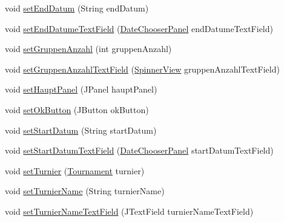 \begin{DoxyCompactItemize}
\item 
void \hyperlink{classde_1_1turnierverwaltung_1_1view_1_1_new_tournament_view_a16a3cedc2bb7866b9c2fd30a07f6a74f}{set\+End\+Datum} (String end\+Datum)
\item 
void \hyperlink{classde_1_1turnierverwaltung_1_1view_1_1_new_tournament_view_a263b61088619e38375dcf896c2e0568b}{set\+End\+Datume\+Text\+Field} (\hyperlink{classde_1_1turnierverwaltung_1_1view_1_1_date_chooser_panel}{Date\+Chooser\+Panel} end\+Datume\+Text\+Field)
\item 
void \hyperlink{classde_1_1turnierverwaltung_1_1view_1_1_new_tournament_view_a5e5ce0d3bdaaadc88e0e88e56a3fbbf8}{set\+Gruppen\+Anzahl} (int gruppen\+Anzahl)
\item 
void \hyperlink{classde_1_1turnierverwaltung_1_1view_1_1_new_tournament_view_a00d370c973799b4e56a149763f550d87}{set\+Gruppen\+Anzahl\+Text\+Field} (\hyperlink{classde_1_1turnierverwaltung_1_1view_1_1_spinner_view}{Spinner\+View} gruppen\+Anzahl\+Text\+Field)
\item 
void \hyperlink{classde_1_1turnierverwaltung_1_1view_1_1_new_tournament_view_a42e5aae628443b74b98d3dac5f86c26f}{set\+Haupt\+Panel} (J\+Panel haupt\+Panel)
\item 
void \hyperlink{classde_1_1turnierverwaltung_1_1view_1_1_new_tournament_view_a6a3edb6077d8df6643d16b3d47a904d2}{set\+Ok\+Button} (J\+Button ok\+Button)
\item 
void \hyperlink{classde_1_1turnierverwaltung_1_1view_1_1_new_tournament_view_a75e0e2607aca3ea690136cf9138289a3}{set\+Start\+Datum} (String start\+Datum)
\item 
void \hyperlink{classde_1_1turnierverwaltung_1_1view_1_1_new_tournament_view_a5a6ea1bee733da3e15b33fca7ca23619}{set\+Start\+Datum\+Text\+Field} (\hyperlink{classde_1_1turnierverwaltung_1_1view_1_1_date_chooser_panel}{Date\+Chooser\+Panel} start\+Datum\+Text\+Field)
\item 
void \hyperlink{classde_1_1turnierverwaltung_1_1view_1_1_new_tournament_view_a3b7feb8ad68ba74bf4399e985b7fae00}{set\+Turnier} (\hyperlink{classde_1_1turnierverwaltung_1_1model_1_1_tournament}{Tournament} turnier)
\item 
void \hyperlink{classde_1_1turnierverwaltung_1_1view_1_1_new_tournament_view_ac1df62f3fe958734f64fece0223f1451}{set\+Turnier\+Name} (String turnier\+Name)
\item 
void \hyperlink{classde_1_1turnierverwaltung_1_1view_1_1_new_tournament_view_a7f5b84628599f7452dc1fa7622d7ef42}{set\+Turnier\+Name\+Text\+Field} (J\+Text\+Field turnier\+Name\+Text\+Field)
\end{DoxyCompactItemize}


